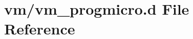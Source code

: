 \hypertarget{vm__progmicro_8d}{}\section{vm/vm\+\_\+progmicro.d File Reference}
\label{vm__progmicro_8d}
